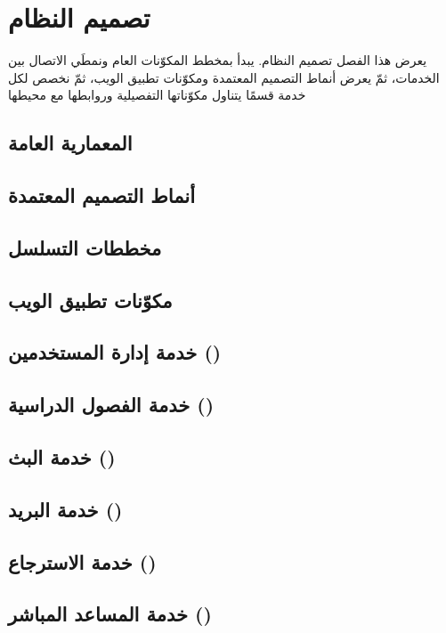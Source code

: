 \chapter{تصميم النظام}

\begin{chaptersummary}
يعرض هذا الفصل تصميم النظام. يبدأ بمخطط المكوّنات العام ونمطَي الاتصال بين الخدمات، ثمّ يعرض أنماط التصميم المعتمدة ومكوّنات تطبيق الويب، ثمّ نخصص لكل خدمة قسمًا يتناول مكوّناتها التفصيلية وروابطها مع محيطها
\end{chaptersummary}

\section{المعمارية العامة}


\section{أنماط التصميم المعتمدة}
\label{sec:design-patterns}


\section{مخططات التسلسل}
\label{sec:sequence-diagrams}


\section{مكوّنات تطبيق الويب}


\section{خدمة إدارة المستخدمين ()}


\section{خدمة الفصول الدراسية ()}


\section{خدمة البث ()}


\section{خدمة البريد ()}


\section{خدمة الاسترجاع ()}


\section{خدمة المساعد المباشر ()}

